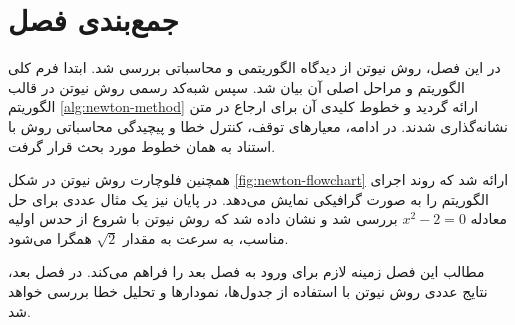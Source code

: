 \section{جمع‌بندی فصل}

در این فصل، روش نیوتن از دیدگاه الگوریتمی و محاسباتی بررسی شد. ابتدا فرم کلی الگوریتم و مراحل اصلی آن بیان شد. سپس شبه‌کد رسمی روش نیوتن در قالب الگوریتم \ref{alg:newton-method} ارائه گردید و خطوط کلیدی آن برای ارجاع در متن نشانه‌گذاری شدند. در ادامه، معیارهای توقف، کنترل خطا و پیچیدگی محاسباتی روش با استناد به همان خطوط مورد بحث قرار گرفت.

همچنین فلوچارت روش نیوتن در شکل \ref{fig:newton-flowchart} ارائه شد که روند اجرای الگوریتم را به صورت گرافیکی نمایش می‌دهد. در پایان نیز یک مثال عددی برای حل معادله \(x^2-2=0\) بررسی شد و نشان داده شد که روش نیوتن با شروع از حدس اولیه مناسب، به سرعت به مقدار \(\sqrt{2}\) همگرا می‌شود.

مطالب این فصل زمینه لازم برای ورود به فصل بعد را فراهم می‌کند. در فصل بعد، نتایج عددی روش نیوتن با استفاده از جدول‌ها، نمودارها و تحلیل خطا بررسی خواهد شد.